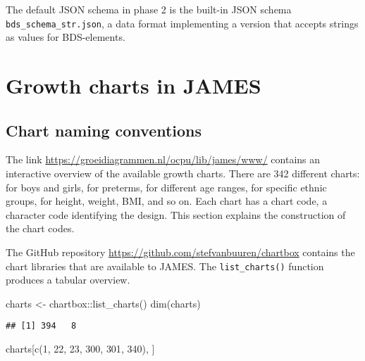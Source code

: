 \documentclass[
]{book}
\newenvironment{Shaded}{\begin{snugshade}}{\end{snugshade}}
\newcommand{\DecValTok}[1]{\textcolor[rgb]{0.00,0.00,0.81}{#1}}
\newcommand{\FunctionTok}[1]{\textcolor[rgb]{0.00,0.00,0.00}{#1}}
\newcommand{\NormalTok}[1]{#1}
\newcommand{\OtherTok}[1]{\textcolor[rgb]{0.56,0.35,0.01}{#1}}
\newcommand{\SpecialCharTok}[1]{\textcolor[rgb]{0.00,0.00,0.00}{#1}}
\begin{document}
The default JSON schema in phase 2 is the built-in JSON schema \texttt{bds\_schema\_str.json}, a data format implementing a version that accepts strings as values for BDS-elements.

\hypertarget{growth-charts-in-james}{%
\chapter{Growth charts in JAMES}\label{growth-charts-in-james}}

\hypertarget{chart-naming-conventions}{%
\section{Chart naming conventions}\label{chart-naming-conventions}}

The link \url{https://groeidiagrammen.nl/ocpu/lib/james/www/} contains an interactive overview of the available growth charts. There are 342 different charts: for boys and girls, for preterms, for different age ranges, for specific ethnic groups, for height, weight, BMI, and so on. Each chart has a chart code, a character code identifying the design. This section explains the construction of the chart codes.

The GitHub repository \url{https://github.com/stefvanbuuren/chartbox} contains the chart libraries that are available to JAMES. The \texttt{list\_charts()} function produces a tabular overview.

\begin{Shaded}
\begin{Highlighting}[]
\NormalTok{charts }\OtherTok{\textless{}{-}}\NormalTok{ chartbox}\SpecialCharTok{::}\FunctionTok{list\_charts}\NormalTok{()}
\FunctionTok{dim}\NormalTok{(charts)}
\end{Highlighting}
\end{Shaded}

\begin{verbatim}
## [1] 394   8
\end{verbatim}

\begin{Shaded}
\begin{Highlighting}[]
\NormalTok{charts[}\FunctionTok{c}\NormalTok{(}\DecValTok{1}\NormalTok{, }\DecValTok{22}\NormalTok{, }\DecValTok{23}\NormalTok{, }\DecValTok{300}\NormalTok{, }\DecValTok{301}\NormalTok{, }\DecValTok{340}\NormalTok{), ]}
\end{Highlighting}
\end{Shaded}
\end{document}
